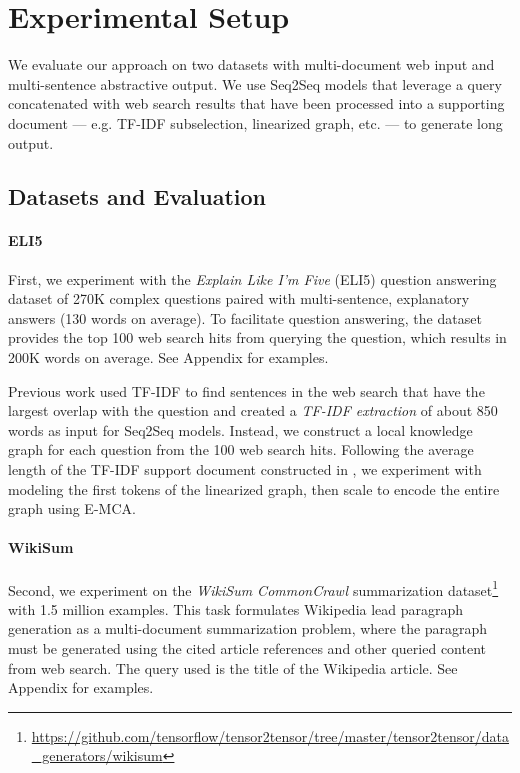 \documentclass[11pt,a4paper]{article}
\begin{document}
\section{Experimental Setup} 

We evaluate our approach on two datasets with multi-document web input and multi-sentence abstractive output. We use Seq2Seq models that leverage a  query concatenated with web search results that have been processed into a supporting document --- e.g. TF-IDF subselection, linearized graph, etc. --- to generate long output.  

\subsection{Datasets and Evaluation} 

\paragraph{ELI5} First, we experiment with the \textit{Explain Like I'm Five} (ELI5) \cite{fan2019explain} question answering dataset of 270K complex questions paired with multi-sentence, explanatory answers (130 words on average). To facilitate question answering, the dataset provides the top 100 web search hits from querying the question, which results in 200K words on average. See Appendix for examples. 

Previous work \cite{fan2019explain} used TF-IDF to find sentences in the web search that have the largest overlap with the question and created a \textit{TF-IDF extraction} of about 850 words as input for Seq2Seq models. Instead, we construct a local knowledge graph for each question from the 100 web search hits. Following the average length of the TF-IDF support document constructed in \cite{fan2019explain}, we experiment with modeling the first  tokens of the linearized graph, then scale to encode the entire graph using E-MCA. 

\paragraph{WikiSum} Second, we experiment on the \textit{WikiSum CommonCrawl} \cite{liu2018generating} summarization dataset\footnote{\url{https://github.com/tensorflow/tensor2tensor/tree/master/tensor2tensor/data_generators/wikisum}} with 1.5 million examples. This task formulates Wikipedia lead paragraph generation as a multi-document summarization problem, where the paragraph must be generated using the cited article references and other queried content from web search. The query used is the title of the Wikipedia article. See Appendix for examples.
\end{document}
